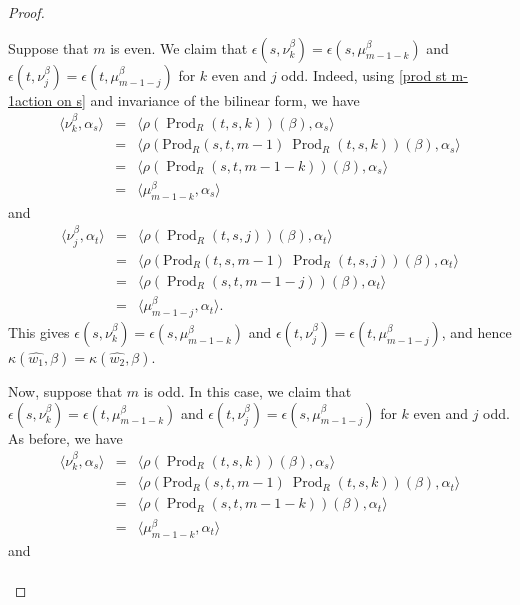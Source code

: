 \documentclass[12pt]{amsart}
\numberwithin{equation}{section}
\begin{document}
\begin{proof}
\begin{enumerate}
Suppose that $m$ is even. We claim that $\epsilon(s,\nu^\beta_k)= \epsilon(s,\mu^\beta_{m-1-k})$ and $\epsilon(t,\nu^\beta_j)= \epsilon(t,\mu^\beta_{m-1-j})$ for $k$ even and $j$ odd. Indeed, using \eqref{prod st m-1action on s} and invariance of the bilinear form, we have
\begin{eqnarray*}
\langle \nu^\beta_k, \alpha_s \rangle &=& \langle \rho(\operatorname{Prod}_R\left(t,s, k\right))(\beta) , \alpha_s \rangle\\
&=& \langle \rho(\text{Prod}_{R}(s,t,m-1)~ \operatorname{Prod}_R\left(t,s, k\right))(\beta), \alpha_s \rangle\\
&=& \langle \rho(\operatorname{Prod}_R\left(s,t, m-1-k\right))(\beta) , \alpha_s \rangle\\
&=& \langle \mu^\beta_{m-1-k}, \alpha_s \rangle
\end{eqnarray*}
and
\begin{eqnarray*}
\langle \nu^\beta_{j}, \alpha_t \rangle &=&
\langle \rho(\operatorname{Prod}_R\left(t,s, j\right))(\beta) , \alpha_t \rangle\\ 
&=& \langle \rho(\text{Prod}_{R}(t, s,m-1)~ \operatorname{Prod}_R\left(t,s, j\right))(\beta), \alpha_t \rangle\\
&=& \langle \rho(\operatorname{Prod}_R\left(s,t, m-1-j\right))(\beta) , \alpha_t \rangle\\
&=& \langle \mu^\beta_{m-1-j}, \alpha_t \rangle.
\end{eqnarray*}
This gives $\epsilon(s,\nu^\beta_k)= \epsilon(s,\mu^\beta_{m-1-k})$ and $\epsilon(t,\nu^\beta_j)= \epsilon(t,\mu^\beta_{m-1-j})$, and hence $\kappa(\widehat{w_1}, \beta)=\kappa(\widehat{w_2}, \beta)$.
\par
Now, suppose that $m$ is odd. In this case, we claim that $\epsilon(s,\nu^\beta_k)= \epsilon(t,\mu^\beta_{m-1-k})$ and $\epsilon(t,\nu^\beta_j)= \epsilon(s,\mu^\beta_{m-1-j})$ for $k$ even and $j$ odd. As before, we have
\begin{eqnarray*}
\langle \nu^\beta_{k}, \alpha_s \rangle &=&
\langle \rho(\operatorname{Prod}_R\left(t,s, k\right))(\beta) , \alpha_s \rangle\\
&=& \langle \rho(\text{Prod}_{R}(s, t,m-1)~ \operatorname{Prod}_R\left(t,s, k\right))(\beta), \alpha_t \rangle\\
&=& \langle \rho(\operatorname{Prod}_R\left(s,t, m-1-k\right))(\beta) , \alpha_t \rangle\\
&=& \langle \mu^\beta_{m-1-k}, \alpha_t \rangle
\end{eqnarray*}
and 
\begin{eqnarray*}

\end{eqnarray*}
\end{enumerate}
\end{proof}
\end{document}
